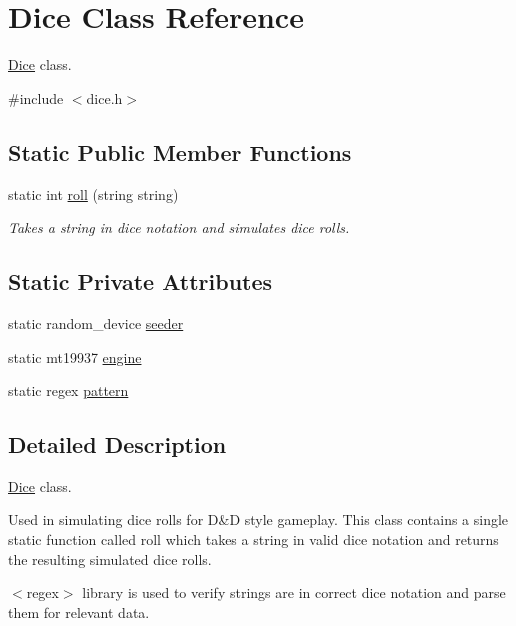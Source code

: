 \hypertarget{class_dice}{}\section{Dice Class Reference}
\label{class_dice}


\hyperlink{class_dice}{Dice} class.  




{\ttfamily \#include $<$dice.\+h$>$}

\subsection*{Static Public Member Functions}
\begin{DoxyCompactItemize}
\item 
static int \hyperlink{class_dice_a4923bdf22040579e6e071e1e987916c2}{roll} (string string)
\begin{DoxyCompactList}\small\item\em Takes a string in dice notation and simulates dice rolls. \end{DoxyCompactList}\end{DoxyCompactItemize}
\subsection*{Static Private Attributes}
\begin{DoxyCompactItemize}
\item 
static random\+\_\+device \hyperlink{class_dice_af481058183b404432e1f0e44ac2edda7}{seeder}
\item 
static mt19937 \hyperlink{class_dice_ac2419b5841ba494b6f8beec92ab0cc6d}{engine}
\item 
static regex \hyperlink{class_dice_aed565a295973cdcc36921307ff4133b0}{pattern}
\end{DoxyCompactItemize}


\subsection{Detailed Description}
\hyperlink{class_dice}{Dice} class. 

Used in simulating dice rolls for D\&D style gameplay. This class contains a single static function called roll which takes a string in valid dice notation and returns the resulting simulated dice rolls.

$<$regex$>$ library is used to verify strings are in correct dice notation and parse them for relevant data.

